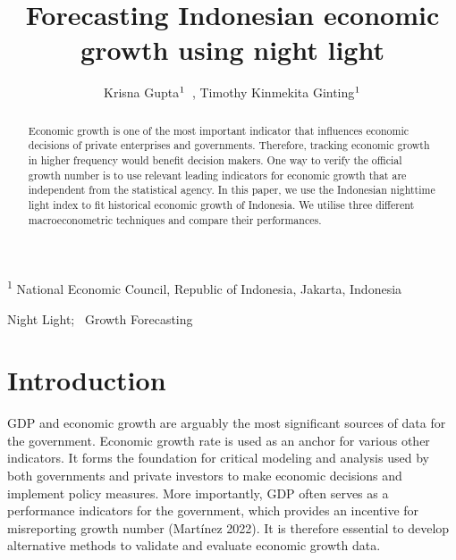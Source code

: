 \documentclass[
]{interact}
\title{Forecasting Indonesian economic growth using night light}
\author{Krisna
Gupta$\textsuperscript{1}$~\orcidlink{0000-0001-8695-0514}, Timothy
Kinmekita Ginting$\textsuperscript{1}$}
\begin{document}
\captionsetup{labelsep=space}
\maketitle
\textsuperscript{1}  National Economic Council, Republic of
Indonesia, Jakarta, Indonesia
\begin{abstract}
Economic growth is one of the most important indicator that influences
economic decisions of private enterprises and governments. Therefore,
tracking economic growth in higher frequency would benefit decision
makers. One way to verify the official growth number is to use relevant
leading indicators for economic growth that are independent from the
statistical agency. In this paper, we use the Indonesian nighttime light
index to fit historical economic growth of Indonesia. We utilise three
different macroeconometric techniques and compare their performances.
\end{abstract}
\begin{keywords}
\def\sep{;\ }
Night Light\sep 
Growth Forecasting
\end{keywords}


\section{Introduction}\label{introduction}

GDP and economic growth are arguably the most significant sources of
data for the government. Economic growth rate is used as an anchor for
various other indicators. It forms the foundation for critical modeling
and analysis used by both governments and private investors to make
economic decisions and implement policy measures. More importantly, GDP
often serves as a performance indicators for the government, which
provides an incentive for misreporting growth number (Martínez 2022). It
is therefore essential to develop alternative methods to validate and
evaluate economic growth data.
\end{document}
